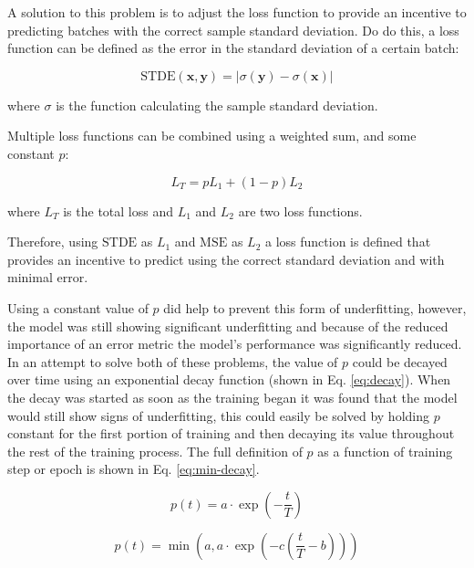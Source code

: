 A solution to this problem is to adjust the loss function to provide an
incentive to predicting batches with the correct sample standard
deviation. Do do this, a loss function can be defined as the error in
the standard deviation of a certain batch:

\begin{equation} \text{STDE}(\mathbf{x}, \mathbf{y}) = |\sigma(\mathbf{y})-\sigma(\mathbf{x})| \label{eq:stderror}\end{equation}

where \(\sigma\) is the function calculating the sample standard
deviation.

Multiple loss functions can be combined using a weighted sum, and some
constant \(p\):

\begin{equation} L_T = pL_1 + (1-p)L_2 \label{eq:combine-loss}\end{equation}

where \(L_T\) is the total loss and \(L_1\) and \(L_2\) are two loss
functions.

Therefore, using \(\text{STDE}\) as \(L_1\) and \(\text{MSE}\) as
\(L_2\) a loss function is defined that provides an incentive to predict
using the correct standard deviation and with minimal error.

Using a constant value of \(p\) did help to prevent this form of
underfitting, however, the model was still showing significant
underfitting and because of the reduced importance of an error metric
the model's performance was significantly reduced. In an attempt to
solve both of these problems, the value of \(p\) could be decayed over
time using an exponential decay function (shown in Eq. \ref{eq:decay}).
When the decay was started as soon as the training began it was found
that the model would still show signs of underfitting, this could easily
be solved by holding \(p\) constant for the first portion of training
and then decaying its value throughout the rest of the training process.
The full definition of \(p\) as a function of training step or epoch is
shown in Eq. \ref{eq:min-decay}.

\begin{equation} p(t) = a\cdot \exp\left(-\frac{t}{T}\right) \label{eq:decay}\end{equation}

\begin{equation} p(t) = \min\left(a, a \cdot \exp\left(-c\left(\frac{t}{T}-b\right)\right)\right) \label{eq:min-decay}\end{equation}

